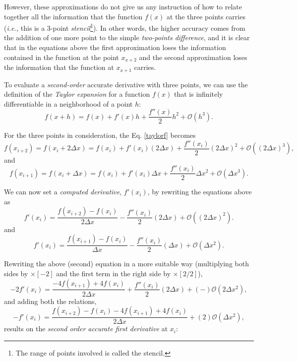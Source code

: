 \documentclass[11pt]{article}
\newcommand{\ie}{{\it i.e., }}
\begin{document}
\begin{enumerate}
 However, these approximations do not give us any instruction of how to relate together all the information that the function $f(x)$ at the three points carries (\ie this is a 3-point \textit{stencil}\footnote{The range of points involved is called the stencil.}). In other words, the higher accuracy comes from the addition of one more point to the simple {\it two-points difference}, and it is clear that in the equations above the first approximation loses the information  contained in the function at the point $x_{x+2}$  and the second approximation loses the information that the function at $x_{x+1}$ carries.
 
\quad
 
To evaluate a {\it second-order} accurate derivative with three points, we can use the definition of the {\it Taylor expansion} for a function $f(x)$ that is infinitely differentiable in a neighborhood of a point $h$:
\begin{equation}
f(x+h) = f(x) + f'(x) h + \frac{f''(x)}{2}h^2 + \mathcal{O}( h^3).
\label{taylorf}
\end{equation}

\quad

For the three points in consideration, the Eq. \ref{taylorf} becomes 
$$f(x_{i+2}) = f(x_{i}+2\Delta x) = f(x_{i}) +f'(x_{i})(2\Delta x) + \frac{f''(x_{i})}{2}(2\Delta x)^2+ \mathcal{O}((2\Delta x)^3),$$
and
$$f(x_{i+1}) = f(x_{i}+\Delta x) = f(x_{i}) +f'(x_{i})\Delta x + \frac{f''(x_{i})}{2}\Delta x^2+ \mathcal{O}(\Delta x^3).$$

\quad

We can now set a {\it computed derivative}, $f'(x_i)$, by rewriting the equations above as
$$f'(x_i) = \frac{f(x_{i+2}) -f(x_{i}) }{2\Delta x}  - \frac{f''(x_{i})}{2}(2\Delta x)+ \mathcal{O}((2\Delta x)^2).$$
and
$$f'(x_i) = \frac{f(x_{i+1}) -f(x_{i}) }{\Delta x}  - \frac{f''(x_{i})}{2}(\Delta x)+ \mathcal{O}(\Delta x^2).$$

\quad

Rewriting the above (second) equation in a more suitable way (multiplying both sides by $\times [-2]$ and the first term in the right side by $\times [2/2]$),
$$- 2f'(x_i) = \frac{-4f(x_{i+1}) +4f(x_{i}) }{2\Delta x}  + \frac{f''(x_{i})}{2}(2\Delta x)+ (-)\mathcal{O}(2\Delta x^2),$$
and adding both the relations, 
$$-f'(x_i) = \frac{f(x_{i+2}) - f(x_i) - 4f(x_{i+1}) + 4f(x_i)}{2\Delta x} + (2)\mathcal{O}(\Delta x^2),$$
results on the {\it second order accurate first derivative} at  $x_i$:\\


\end{enumerate}
\end{document}
